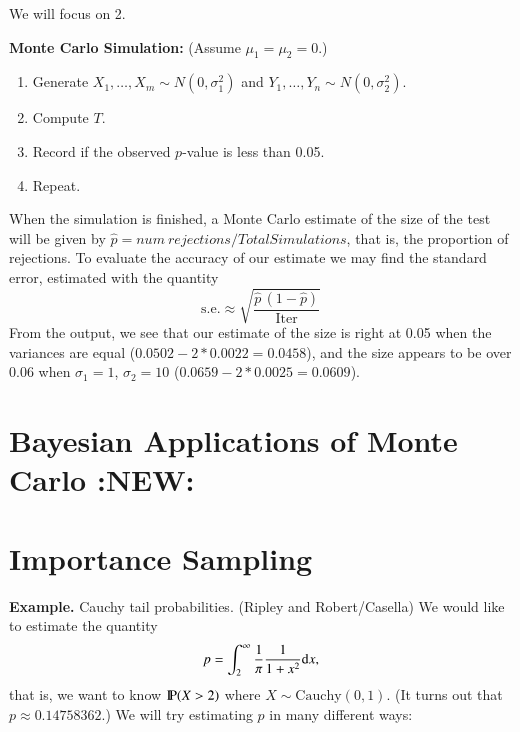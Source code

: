 \documentclass[captions=tableheading]{scrbook}
\begin{document}
We will focus on 2.

\textbf{Monte Carlo Simulation:} (Assume $\mu_{1}=\mu_{2}=0$.)

\begin{enumerate}
\item Generate $X_{1},\ldots,X_{m}\sim N(0,\sigma_{1}^{2})$ and $Y_{1},\ldots,Y_{n}\sim N(0,\sigma_{2}^{2})$.
\item Compute $T$.
\item Record if the observed \(p\)-value is less than 0.05.
\item Repeat.
\end{enumerate}

When the simulation is finished, a Monte Carlo estimate of the size of the test will be given by $\hat{p}=\mathit{num\ rejections/TotalSimulations}$, that is, the proportion of rejections. To evaluate the accuracy of our estimate we may find the standard error, estimated with the quantity
\[
\mathrm{s.e.}\approx\sqrt{\frac{\hat{p}\,(1-\hat{p})}{\mathrm{Iter}}}
\]
From the output, we see that our estimate of the size is right at 0.05   when the variances are equal ($0.0502-2*0.0022=0.0458$), and the size appears to be over 0.06 when $\sigma_{1}=1$, $\sigma_{2}=10$ ($0.0659-2*0.0025=0.0609$).  
\section{Bayesian Applications of Monte Carlo \textbf{:NEW:}}
\label{sec-3_3}
\section{Importance Sampling}
\label{sec-3_4}


\textbf{Example.} Cauchy tail probabilities. (Ripley and Robert/Casella) We would like to estimate the quantity 
\[
p=\int_{2}^{\infty}\frac{1}{\pi}\frac{1}{1+x^{2}}\diff x,
\]
that is, we want to know $\P(X > 2)$ where $X \sim \mathrm{Cauchy}(0,1)$. (It turns out that $p\approx 0.14758362$.) We will try estimating $p$ in many different ways:
\end{document}
